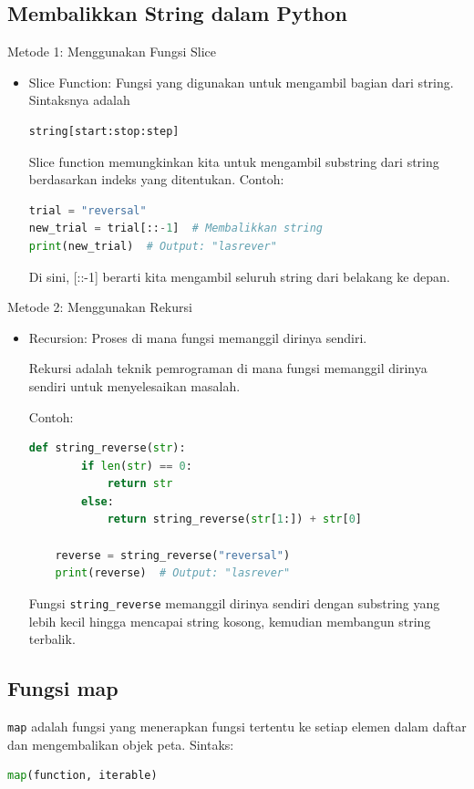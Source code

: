 \documentclass{article}
\begin{document}
\subsection{Membalikkan String dalam Python}
Metode 1: Menggunakan Fungsi Slice
\begin{itemize}
    \item Slice Function: Fungsi yang digunakan untuk mengambil bagian dari string. Sintaksnya adalah
          \begin{lstlisting}[language=Python, caption={}, captionpos=b]
string[start:stop:step]
\end{lstlisting}

          Slice function memungkinkan kita untuk mengambil substring dari string berdasarkan indeks yang ditentukan.
          Contoh:
          \begin{lstlisting}[language=Python, caption={}, captionpos=b]
trial = "reversal"
new_trial = trial[::-1]  # Membalikkan string
print(new_trial)  # Output: "lasrever"
\end{lstlisting}
          Di sini, [::-1] berarti kita mengambil seluruh string dari belakang ke depan.
\end{itemize}
Metode 2: Menggunakan Rekursi
\begin{itemize}
    \item Recursion: Proses di mana fungsi memanggil dirinya sendiri.

          Rekursi adalah teknik pemrograman di mana fungsi memanggil dirinya sendiri untuk menyelesaikan masalah.

          Contoh:
          \begin{lstlisting}[language=Python, caption={}, captionpos=b]
    def string_reverse(str):
        if len(str) == 0:
            return str
        else:
            return string_reverse(str[1:]) + str[0]

    reverse = string_reverse("reversal")
    print(reverse)  # Output: "lasrever"
    \end{lstlisting}

          Fungsi \verb|string_reverse| memanggil dirinya sendiri dengan substring yang lebih kecil hingga mencapai string kosong, kemudian membangun string terbalik.
\end{itemize}

\subsection{Fungsi map}
\verb|map| adalah fungsi yang menerapkan fungsi tertentu ke setiap elemen dalam daftar dan mengembalikan objek peta.
Sintaks:
\begin{lstlisting}[language=Python, caption={}, captionpos=b]
map(function, iterable)
\end{lstlisting}
\end{document}
